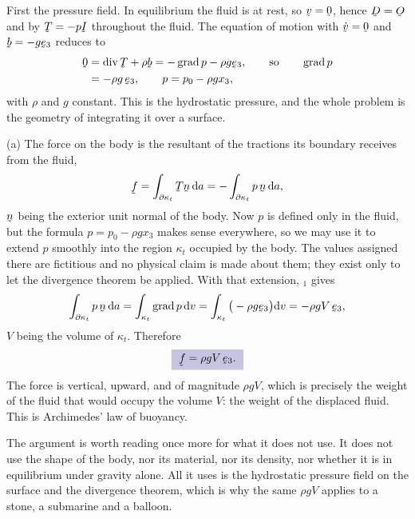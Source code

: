 \begin{solution}
First the pressure field. In equilibrium the fluid is at rest, so
$\bv=\bze$, hence $\bD=\Ob$ and by  $\bT=-p\I$ throughout the
fluid. The equation of motion  with $\dot\bv=\bze$ and
$\bb=-g\be_{3}$ reduces to
\[
\begin{aligned}
   \bze&=\dvg\bT+\rho\bb=-\grad p-\rho g\be_{3},
   \qquad\text{so}\qquad
   \grad p\\
   &=-\rho g\,\be_{3},
   \qquad p=p_{0}-\rho g x_{3},
\end{aligned}
\]
with $\rho$ and $g$ constant. This is the hydrostatic pressure, and the
whole problem is the geometry of integrating it over a surface.

(a) The force on the body is the resultant of the tractions its
boundary receives from the fluid,
\[
   \bff=\int_{\partial\kappa_{t}}\bT\bn\,\dl a
   =-\int_{\partial\kappa_{t}}p\,\bn\,\dl a ,
\]
$\bn$ being the exterior unit normal of the body. Now $p$ is defined
only in the fluid, but the formula $p=p_{0}-\rho gx_{3}$ makes sense
everywhere, so we may use it to extend $p$ smoothly into the region
$\kappa_{t}$ occupied by the body. The values assigned there are
fictitious and no physical claim is made about them; they exist only to
let the divergence theorem be applied. With that extension,
$_{1}$ gives
\[
   \int_{\partial\kappa_{t}}p\,\bn\,\dl a
   =\int_{\kappa_{t}}\grad p\,\dl v
   =\int_{\kappa_{t}}\big(-\rho g\be_{3}\big)\dl v
   =-\rho g V\,\be_{3},
\]
$V$ being the volume of $\kappa_{t}$. Therefore
\[
   \boxed{\ \bff=\rho g V\,\be_{3}. \ }
\]
The force is vertical, upward, and of magnitude $\rho gV$, which is
precisely the weight of the fluid that would occupy the volume $V$: the
weight of the displaced fluid. This is Archimedes' law of buoyancy.

The argument is worth reading once more for what it does not use. It
does not use the shape of the body, nor its material, nor its density,
nor whether it is in equilibrium under gravity alone. All it uses is the
hydrostatic pressure field on the surface and the divergence theorem,
which is why the same $\rho gV$ applies to a stone, a submarine and a
balloon.


\end{solution}
